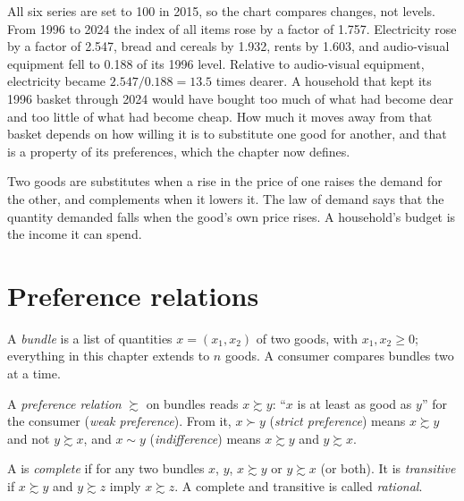 All six series are set to 100 in 2015, so the chart compares changes, not
levels. From 1996 to 2024 the index of all items rose by a factor of 1.757.
Electricity rose by a factor of 2.547, bread and cereals by 1.932, rents by
1.603, and audio-visual equipment fell to 0.188 of its 1996
level. %
Relative to audio-visual equipment, electricity became
$2.547/0.188 = 13.5$ times dearer. %
A household that kept its 1996 basket through 2024 would have bought too
much of what had become dear and too little of what had become cheap. How
much it moves away from that basket depends on how willing it is to
substitute one good for another, and that is a property of its
preferences, which the chapter now defines.

\begin{recall}
Two goods are substitutes when a rise in the price of one raises the demand
for the other, and complements when it lowers it. The law of demand says
that the quantity demanded falls when the good's own price rises. A
household's budget is the income it can spend.
\end{recall}

\section{Preference relations}\label{sec:b1:preferences-and-utility:relations}

A \emph{bundle} is a list of quantities $x = (x_1, x_2)$ of two goods, with
$x_1, x_2 \ge 0$; everything in this chapter extends to $n$ goods. A
consumer compares bundles two at a time.

\begin{definition}\label{def:b1:preferences-and-utility:preference}
A \emph{preference relation} $\succsim$ on bundles reads $x \succsim y$: ``$x$
is at least as good as $y$'' for the consumer (\emph{weak preference}). From
it, $x \succ y$ (\emph{strict preference}) means $x \succsim y$ and not
$y \succsim x$, and $x \sim y$ (\emph{indifference}) means $x \succsim y$ and
$y \succsim x$.
\end{definition}

\begin{definition}\label{def:b1:preferences-and-utility:rational}
A  is \emph{complete} if for any two bundles $x$, $y$,
$x \succsim y$ or $y \succsim x$ (or both). It is \emph{transitive} if
$x \succsim y$ and $y \succsim z$ imply $x \succsim z$. A complete and transitive
 is called \emph{rational}.
\end{definition}

